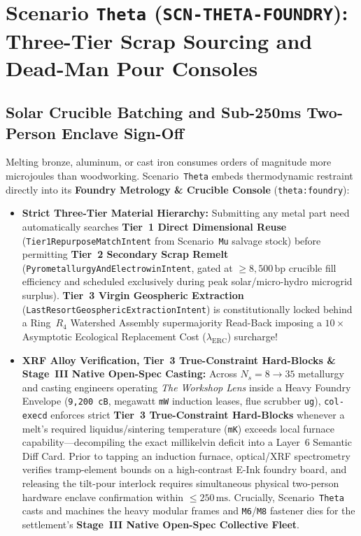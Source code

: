 \section{Scenario \texttt{Theta} (\texttt{SCN-THETA-FOUNDRY}): Three-Tier Scrap Sourcing and Dead-Man Pour Consoles}
\label{sec:wave-d-theta}

\subsection{Solar Crucible Batching and Sub-250ms Two-Person Enclave Sign-Off}

Melting bronze, aluminum, or cast iron consumes orders of magnitude more microjoules than woodworking. Scenario~\texttt{Theta} embeds thermodynamic restraint directly into its \textbf{Foundry Metrology \& Crucible Console} (\texttt{theta:foundry}):
\begin{itemize}
    \item \textbf{Strict Three-Tier Material Hierarchy:} Submitting any metal part need automatically searches \textbf{Tier~1 Direct Dimensional Reuse} (\texttt{Tier1RepurposeMatchIntent} from Scenario~\texttt{Mu} salvage stock) before permitting \textbf{Tier~2 Secondary Scrap Remelt} (\texttt{PyrometallurgyAndElectrowinIntent}, gated at $\ge 8{,}500\,\mathrm{bp}$ crucible fill efficiency and scheduled exclusively during peak solar/micro-hydro microgrid surplus). \textbf{Tier~3 Virgin Geospheric Extraction} (\texttt{LastResortGeosphericExtractionIntent}) is constitutionally locked behind a Ring~$R_4$ Watershed Assembly supermajority Read-Back imposing a $10\times$ Asymptotic Ecological Replacement Cost ($\lambda_{\mathrm{ERC}}$) surcharge!
    \item \textbf{XRF Alloy Verification, Tier~3 True-Constraint Hard-Blocks \& Stage~III Native Open-Spec Casting:} Across $N_s = 8 \to 35$ metallurgy and casting engineers operating \textit{The Workshop Lens} inside a Heavy Foundry Envelope (\texttt{9,200 cB}, megawatt \texttt{mW} induction leases, flue scrubber \texttt{ug}), \texttt{col-execd} enforces strict \textbf{Tier~3 True-Constraint Hard-Blocks} whenever a melt's required liquidus/sintering temperature (\texttt{mK}) exceeds local furnace capability---decompiling the exact millikelvin deficit into a Layer~6 Semantic Diff Card. Prior to tapping an induction furnace, optical/XRF spectrometry verifies tramp-element bounds on a high-contrast E-Ink foundry board, and releasing the tilt-pour interlock requires simultaneous physical two-person hardware enclave confirmation within $\le 250\,\mathrm{ms}$. Crucially, Scenario~\texttt{Theta} casts and machines the heavy modular frames and \texttt{M6}/\texttt{M8} fastener dies for the settlement's \textbf{Stage~III Native Open-Spec Collective Fleet}.
\end{itemize}

